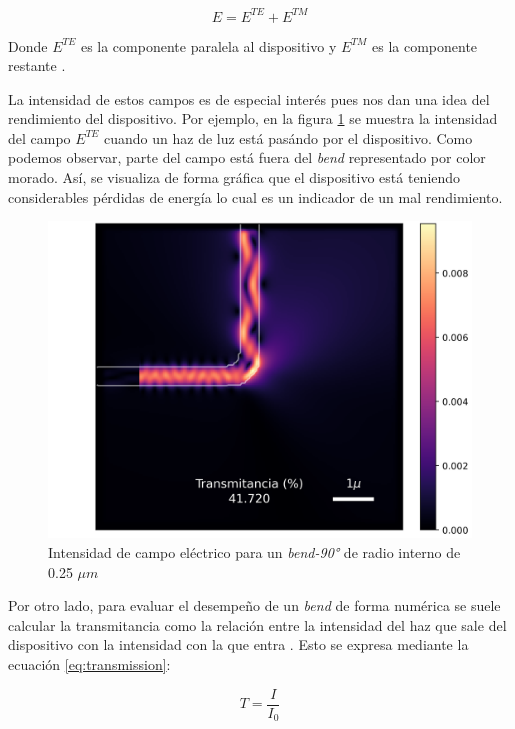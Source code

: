 \begin{equation}
  E = E^{TE} + E^{TM}
\label{eq:field}
\end{equation}

Donde $E^{TE}$ es la componente paralela al dispositivo y $E^{TM}$ es la componente restante \citep{Hohenester2020}. 

La intensidad de estos campos es de especial interés pues nos dan una idea del rendimiento del dispositivo. 
Por ejemplo, en la figura \ref{fig:efield} se muestra la intensidad del campo $E^{TE}$ cuando un haz de luz está pasándo por el dispositivo. 
Como podemos observar, parte del campo está fuera del \emph{bend} representado por color morado.
Así, se visualiza de forma gráfica que el dispositivo está teniendo considerables pérdidas de energía lo cual es un indicador de un mal rendimiento.


\begin{figure}[ht]
  \centering
  \includegraphics[scale=0.8]{image/theory/bend-field.png}
  \caption{Intensidad de campo eléctrico para un \emph{bend-90°} de radio interno de 0.25 $\mu m$}
  \label{fig:efield}
\end{figure}

Por otro lado, para evaluar el desempeño de un \emph{bend} de forma numérica se suele calcular la transmitancia como la relación entre la intensidad del haz que sale del dispositivo con la intensidad con la que entra \citep{Su2020}. Esto se expresa mediante la ecuación \ref{eq:transmission}:

\begin{equation}
  T = \frac{I}{I_0}
\label{eq:transmission}
\end{equation}


